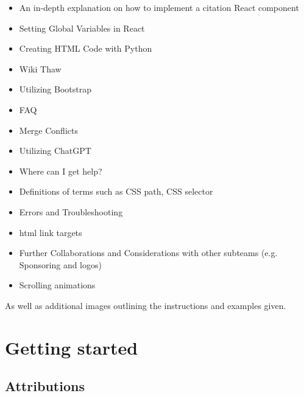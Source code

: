 \documentclass[a4paper, 11pt, twoside]{book}
\begin{document}
\begin{itemize}
    \item An in-depth explanation on how to implement a citation React component
    \item Setting Global Variables in React
    \item Creating HTML Code with Python
    \item Wiki Thaw
    \item Utilizing Bootstrap
    \item FAQ
    \item Merge Conflicts
    \item Utilizing ChatGPT
    \item Where can I get help?
    \item Definitions of terms such as CSS path, CSS selector
    \item Errors and Troubleshooting
    \item html link targets
    \item Further Collaborations and Considerations with other subteams (e.g. Sponsoring and logos)
    \item Scrolling animations
\end{itemize}
As well as additional images outlining the instructions and examples given.
\newpage

\mainmatter
\pagecolor{pagecolor}
\chapter{Getting started} \label{sec:started}


\backmatter
\pagecolor{pagecolor}
\section*{Attributions}

\end{document}
